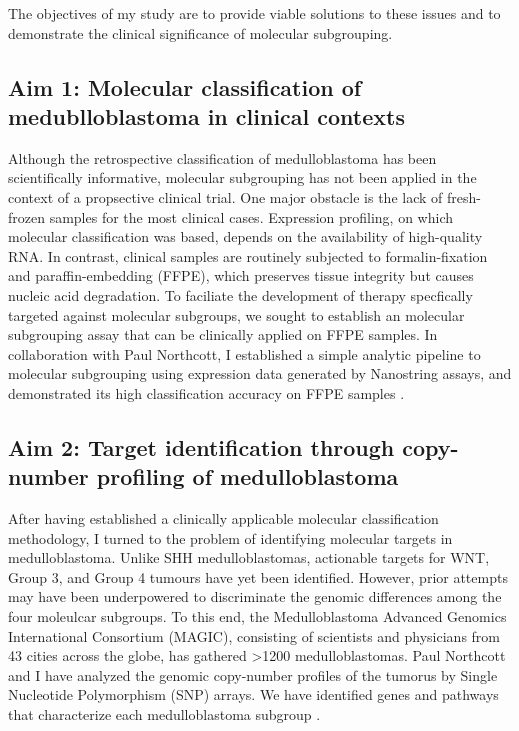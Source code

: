 \documentclass[11pt,letterpaper]{article}
\theoremstyle{definition}
\begin{document}
The objectives of my study are to provide viable solutions to these issues and to demonstrate the clinical significance of molecular subgrouping.

\subsection{Aim 1: Molecular classification of medublloblastoma in clinical contexts}

Although the retrospective classification of medulloblastoma has been scientifically informative, molecular subgrouping has not been applied in the context of a propsective clinical trial. One major obstacle is the lack of fresh-frozen samples for the most clinical cases. Expression profiling, on which molecular classification was based, depends on the availability of high-quality RNA. In contrast, clinical samples are routinely subjected to formalin-fixation and paraffin-embedding (FFPE), which preserves tissue integrity but causes nucleic acid degradation. To faciliate the development of therapy specfically targeted against molecular subgroups, we sought to establish an molecular subgrouping assay that can be clinically applied on FFPE samples. In collaboration with Paul Northcott, I established a simple analytic pipeline to molecular subgrouping using expression data generated by Nanostring assays, and demonstrated its high classification accuracy on FFPE samples .

\subsection{Aim 2: Target identification through copy-number profiling of medulloblastoma}

After having established a clinically applicable molecular classification methodology, I turned to the problem of identifying molecular targets in medulloblastoma. Unlike SHH medulloblastomas, actionable targets for WNT, Group 3, and Group 4 tumours have yet been identified. However, prior attempts may have been underpowered to discriminate the genomic differences among the four moleulcar subgroups. To this end, the Medulloblastoma Advanced Genomics International Consortium (MAGIC), consisting of scientists and physicians from 43 cities across the globe, has gathered >1200 medulloblastomas. Paul Northcott and I have analyzed the genomic copy-number profiles of the tumorus by Single Nucleotide Polymorphism (SNP) arrays. We have identified genes and pathways that characterize each medulloblastoma subgroup .
\end{document}
